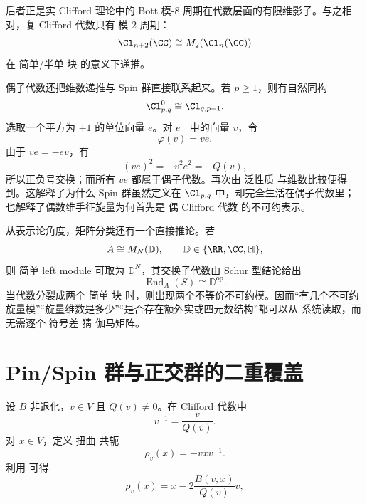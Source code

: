 后者正是实 Clifford 理论中的 Bott 模-8 周期在代数层面的有限维影子。与之相对，复 Clifford 代数只有 模-2 周期：
\[
\Cl_{n+2}(\CC)
\cong M_2\!\left(\Cl_{n}(\CC)\right)
\]
在 简单/半单 块 的意义下递推。

偶子代数还把维数递推与 Spin 群直接联系起来。若 $p\ge1$，则有自然同构
\begin{equation}
\Cl_{p,q}^{0}
\cong
\Cl_{q,p-1}.
\label{eq:clifford-even-subalgebra}
\end{equation}
选取一个平方为 $+1$ 的单位向量 $e$。对 $e^\perp$ 中的向量 $v$，令
\[
\varphi(v)=ve.
\]
由于 $ve=-ev$，有
\[
(ve)^2=-v^2e^2=-Q(v),
\]
所以正负号交换；而所有 $ve$ 都属于偶子代数。再次由 泛性质 与维数比较便得到。这解释了为什么 Spin 群虽然定义在 $\Cl_{p,q}$ 中，却完全生活在偶子代数里；也解释了偶数维手征旋量为何首先是 偶 Clifford 代数 的不可约表示。

从表示论角度，矩阵分类还有一个直接推论。若
\[
A\cong M_N(\mathbb D),
\qquad
\mathbb D\in\{\RR,\CC,\mathbb H\},
\]
则 简单 left module 可取为 $\mathbb D^N$，其交换子代数由 Schur 型结论给出
\[
\operatorname{End}_{A}(S)\cong\mathbb D^{\mathrm{op}}.
\]
当代数分裂成两个 简单 块 时，则出现两个不等价不可约模。因而“有几个不可约旋量模”“旋量维数是多少”“是否存在额外实或四元数结构”都可以从 系统读取，而无需逐个 符号差 猜 伽马矩阵。

\section{Pin/Spin 群与正交群的二重覆盖}
\label{sec:pin-spin}
设 $B$ 非退化，$v\in V$ 且 $Q(v)\neq0$。在 Clifford 代数中
\[
v^{-1}=\frac{v}{Q(v)}.
\]
对 $x\in V$，定义 扭曲 共轭
\begin{equation*}\rho_v(x)=-vxv^{-1}.\end{equation*}
利用 可得
\begin{equation}
\rho_v(x)
=x-2\frac{B(v,x)}{Q(v)}v,
\label{eq:orthogonal-reflection}
\end{equation}

